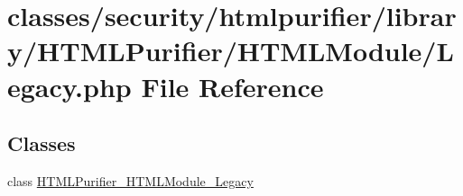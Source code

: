 \hypertarget{Legacy_8php}{\section{classes/security/htmlpurifier/library/\+H\+T\+M\+L\+Purifier/\+H\+T\+M\+L\+Module/\+Legacy.php File Reference}
\label{Legacy_8php}
}
\subsection*{Classes}
\begin{DoxyCompactItemize}
\item 
class \hyperlink{classHTMLPurifier__HTMLModule__Legacy}{H\+T\+M\+L\+Purifier\+\_\+\+H\+T\+M\+L\+Module\+\_\+\+Legacy}
\end{DoxyCompactItemize}
